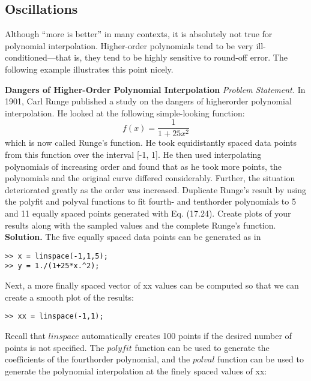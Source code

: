 \documentclass[../main.tex]{subfiles}
\begin{document}
\subsection{Oscillations}

Although “more is better” in many contexts, it is absolutely not true for polynomial interpolation. Higher-order polynomials tend to be very ill-conditioned—that is, they tend to be
highly sensitive to round-off error. The following example illustrates this point nicely.

\begin{exmp} \textbf{Dangers of Higher-Order Polynomial Interpolation}
    \noindent\textit{Problem Statement.} In 1901, Carl Runge published a study on the dangers of higherorder polynomial interpolation. He looked at the following simple-looking function:
    \begin{equation}
        \tag{17.24}
        f(x)=\frac{1}{1+25 x^{2}}
        \end{equation}
        which is now called Runge's function. He took equidistantly spaced data points from this
        function over the interval [-1, 1]. He then used interpolating polynomials of increasing
        order and found that as he took more points, the polynomials and the original curve differed
        considerably. Further, the situation deteriorated greatly as the order was increased. Duplicate Runge's result by using the polyfit and polyval functions to fit fourth- and tenthorder polynomials to 5 and 11 equally spaced points generated with Eq. (17.24). Create
        plots of your results along with the sampled values and the complete Runge's function.\\

    \noindent \textbf{Solution.} The five equally spaced data points can be generated as in
    \begin{lstlisting}[numbers=none]
>> x = linspace(-1,1,5);
>> y = 1./(1+25*x.^2);
    \end{lstlisting}
    Next, a more finally spaced vector of xx values can be computed so that we can create a
smooth plot of the results:
    \begin{lstlisting}[numbers=none]
>> xx = linspace(-1,1);
    \end{lstlisting}
    Recall that $linspace$ automatically creates 100 points if the desired number of points is
not specified. The $polyfit$ function can be used to generate the coefficients of the fourthorder polynomial, and the $polval$ function can be used to generate the polynomial interpolation at the finely spaced values of xx:


\end{exmp}
\end{document}
